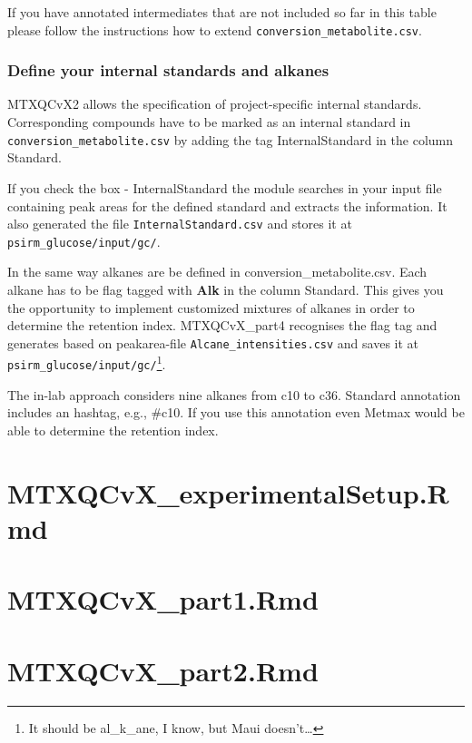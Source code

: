 \documentclass[]{book}
\let\rmarkdownfootnote\footnote%
\def\footnote{\protect\rmarkdownfootnote}
\theoremstyle{definition}
\theoremstyle{definition}
\theoremstyle{definition}
\theoremstyle{remark}
\begin{document}
If you have annotated intermediates that are not included so far in this
table please follow the instructions how to extend
\texttt{conversion\_metabolite.csv}.

\subsection{Define your internal standards and
alkanes}\label{define-your-internal-standards-and-alkanes}

MTXQCvX2 allows the specification of project-specific internal
standards. Corresponding compounds have to be marked as an internal
standard in \texttt{conversion\_metabolite.csv} by adding the tag
InternalStandard in the column Standard.

If you check the box - InternalStandard the module searches in your
input file containing peak areas for the defined standard and extracts
the information. It also generated the file
\texttt{InternalStandard.csv} and stores it at
\texttt{psirm\_glucose/input/gc/}.

In the same way alkanes are be defined in conversion\_metabolite.csv.
Each alkane has to be flag tagged with \textbf{Alk} in the column
Standard. This gives you the opportunity to implement customized
mixtures of alkanes in order to determine the retention index.
MTXQCvX\_part4 recognises the flag tag and generates based on
peakarea-file \texttt{Alcane\_intensities.csv} and saves it at
\texttt{psirm\_glucose/input/gc/}\footnote{It should be al\_k\_ane, I
  know, but Maui doesn't\ldots{}}.

The in-lab approach considers nine alkanes from c10 to c36. Standard
annotation includes an hashtag, e.g., \#c10. If you use this annotation
even Metmax would be able to determine the retention index.

\chapter{MTXQCvX\_experimentalSetup.Rmd}\label{mtxqcvx_experimentalsetup.rmd}

\chapter{MTXQCvX\_part1.Rmd}\label{mtxqcvx_part1.rmd}

\chapter{MTXQCvX\_part2.Rmd}\label{mtxqcvx_part2.rmd}
\end{document}
